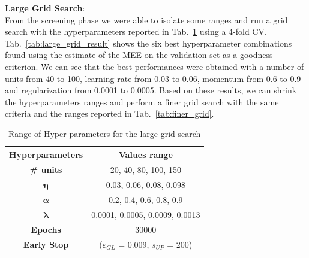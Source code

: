 \documentclass[11pt]{article}
\begin{document}
\noindent\textbf{Large Grid Search}:\\
From the screening phase we were able to isolate some ranges and run a grid search with the hyperparameters reported in Tab.~\ref{tab:large_grid} using a 4-fold CV. Tab.~\ref{tab:large_grid_result} shows the six best hyperparameter combinations found using the estimate of the MEE on the validation set as a goodness criterion. We can see that the best performances were obtained with a number of units from 40 to 100, learning rate from 0.03 to 0.06, momentum from 0.6 to 0.9 and regularization from 0.0001 to 0.0005. Based on these results, we can shrink the hyperparameters ranges and perform a finer grid search with the same criteria and the ranges reported in Tab.~\ref{tab:finer_grid}.

\begin{table}[H]
\small
    \centering
    \begin{tabular}{ |c|c| }
        \hline
        \textbf{Hyperparameters} & \textbf{Values range}\\
        \hline
        \hline
        \textbf{\# units} & 20, 40, 80, 100, 150\\
        \hline
         $\boldsymbol{\eta}$ & 0.03, 0.06, 0.08, 0.098\\
        \hline
        $\boldsymbol{\alpha}$ & 0.2, 0.4, 0.6, 0.8, 0.9\\
        \hline
        $\boldsymbol{\lambda}$ & 0.0001, 0.0005, 0.0009, 0.0013\\
        \hline
        \textbf{Epochs} & 30000\\
        \hline
        \textbf{Early Stop} & ($\varepsilon_{GL}$ = 0.009, $s_{UP}$ = 200)\\
        \hline
    \end{tabular}
    \caption{Range of Hyper-parameters for the large grid search}
    \label{tab:large_grid}
\end{table}
\end{document}
